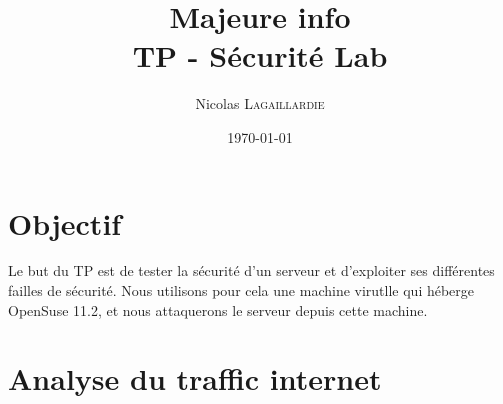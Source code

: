 \documentclass{article}
\title{Majeure info \\ TP - S\'{e}curit\'{e} Lab} %
\author{Nicolas \textsc{Lagaillardie}} %
\date{\today} %
\begin{document}
\maketitle %

\tableofcontents
\newpage




\section{Objectif}

Le but du TP est de tester la s\'{e}curit\'{e} d'un serveur et d'exploiter ses diff\'{e}rentes failles de s\'{e}curit\'{e}. Nous utilisons pour cela une machine virutlle qui h\'{e}berge OpenSuse 11.2, et nous attaquerons le serveur depuis cette machine.
 

\section{Analyse du traffic internet}
\end{document}
